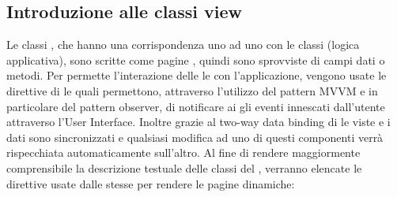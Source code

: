 \subsection{Introduzione alle classi view}
Le classi , che hanno una corrispondenza uno ad uno con le classi  (logica applicativa), sono scritte come pagine , quindi sono sprovviste di campi dati o metodi.
Per permette l’interazione delle le   con l'applicazione, vengono usate le direttive di  le quali permettono, attraverso l'utilizzo del pattern MVVM e in particolare del pattern observer,
di notificare ai  gli eventi innescati dall'utente attraverso l'User Interface. 
Inoltre grazie al two-way data binding di  le viste e i dati sono sincronizzati e qualsiasi modifica ad uno di questi componenti verrà rispecchiata automaticamente sull'altro. 
Al fine di rendere maggiormente comprensibile la descrizione testuale delle classi del  , verranno elencate le direttive  usate dalle stesse per rendere le pagine  dinamiche:

